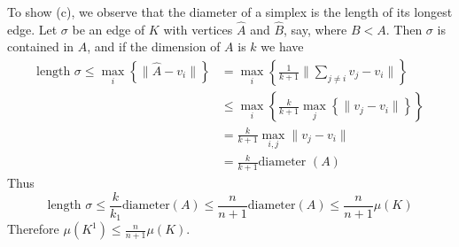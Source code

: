 \documentclass[a4paper]{article}
\begin{document}
To show (c), we observe that the diameter of a simplex is the length of its
longest edge. Let $\sigma$ be an edge of $K$ with vertices $\hat{A}$ and
$\hat{B}$, say, where $B < A$. Then $\sigma$ is contained in $A$, and if the
dimension of $A$ is $k$ we have
\begin{align*}
\text{length } \sigma
\le \max_i \left\{ 
\|\hat{A} - v_i\|   \right\} 
&= \max_i \left\{ \frac{1}{k+1} \|\sum_{j \neq i} v_j - v_i \|  
\right\} \\
&\le 
\max_i \left\{ \frac{k}{k+1}
\max_j \left\{ \|v_j - v_i\| \right\} \right\} \\
&= \frac{k}{k+1} \max_{i,j} \|v_j - v_i\| \\
&= \frac{k}{k+1} \text{diameter } (A)
\end{align*}
Thus
\[
\text{length }\sigma
\le \frac{k}{k_1} \text{diameter}(A)
\le \frac{n}{n+1} \text{diameter}(A)
\le \frac{n}{n+1} \mu(K)
\] 
Therefore
$\mu (K^{1}) \le \frac{n}{n+1}\mu(K)$.\\
\linebreak
\end{document}
